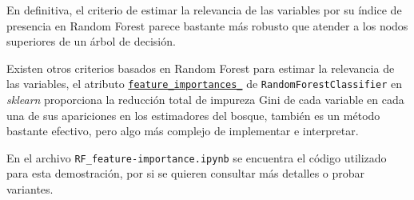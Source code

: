 \documentclass{article}
\begin{document}
  En definitiva, el criterio de estimar la relevancia de las variables
  por su índice de presencia en Random Forest parece bastante más
  robusto que atender a los nodos superiores de un árbol de decisión.

  Existen otros criterios basados en Random Forest para estimar la
  relevancia de las variables, el atributo
  \href{https://scikit-learn.org/stable/modules/generated/sklearn.ensemble.RandomForestClassifier.html#sklearn.ensemble.RandomForestClassifier.feature_importances_}{\texttt{feature\_importances\_}}
  de \texttt{RandomForestClassifier} en \textit{sklearn} proporciona
  la reducción total de impureza Gini de cada variable en cada una de
  sus apariciones en los estimadores del bosque, también es un método
  bastante efectivo, pero algo más complejo de implementar e
  interpretar.

  En el archivo \texttt{RF\_feature-importance.ipynb} se encuentra el
  código utilizado para esta demostración, por si se quieren consultar
  más detalles o probar variantes.
\end{document}
